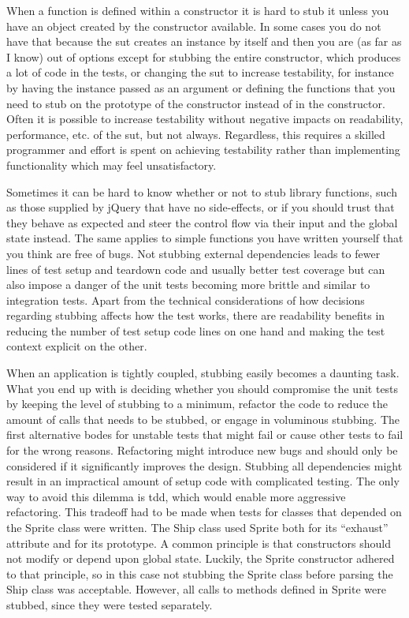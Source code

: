 \documentclass[11pt]{article}
\begin{document}
When a function is defined within a constructor it is hard to stub it unless you have an object created by the constructor available. In some cases you do not have that because the \gls{sut} creates an instance by itself and then you are (as far as I know) out of options except for stubbing the entire constructor, which produces a lot of code in the tests, or changing the \gls{sut} to increase testability, for instance by having the instance passed as an argument or defining the functions that you need to stub on the prototype of the constructor instead of in the constructor. Often it is possible to increase testability without negative impacts on readability, performance, etc. of the \gls{sut}, but not always. Regardless, this requires a skilled programmer and effort is spent on achieving testability rather than implementing functionality which may feel unsatisfactory.

Sometimes it can be hard to know whether or not to stub library functions, such as those supplied by jQuery that have no side-effects, or if you should trust that they behave as expected and steer the control flow via their input and the global state instead. The same applies to simple functions you have written yourself that you think are free of bugs. Not stubbing external dependencies leads to fewer lines of test setup and teardown code and usually better test coverage but can also impose a danger of the unit tests becoming more brittle and similar to integration tests. Apart from the technical considerations of how decisions regarding stubbing affects how the test works, there are readability benefits in reducing the number of test setup code lines on one hand and making the test context explicit on the other.

When an application is tightly coupled, stubbing easily becomes a daunting task. What you end up with is deciding whether you should compromise the unit tests by keeping the level of stubbing to a minimum, refactor the code to reduce the amount of calls that needs to be stubbed, or engage in voluminous stubbing. The first alternative bodes for unstable tests that might fail or cause other tests to fail for the wrong reasons. Refactoring might introduce new bugs and should only be considered if it significantly improves the design. Stubbing all dependencies might result in an impractical amount of setup code with complicated testing. The only way to avoid this dilemma is \gls{tdd}, which would enable more aggressive refactoring. This tradeoff had to be made when tests for classes that depended on the Sprite class were written. The Ship class used Sprite both for its ``exhaust'' attribute and for its prototype. A common principle is that constructors should not modify or depend upon global state. Luckily, the Sprite constructor adhered to that principle, so in this case not stubbing the Sprite class before parsing the Ship class was acceptable. However, all calls to methods defined in Sprite were stubbed, since they were tested separately.
\end{document}

